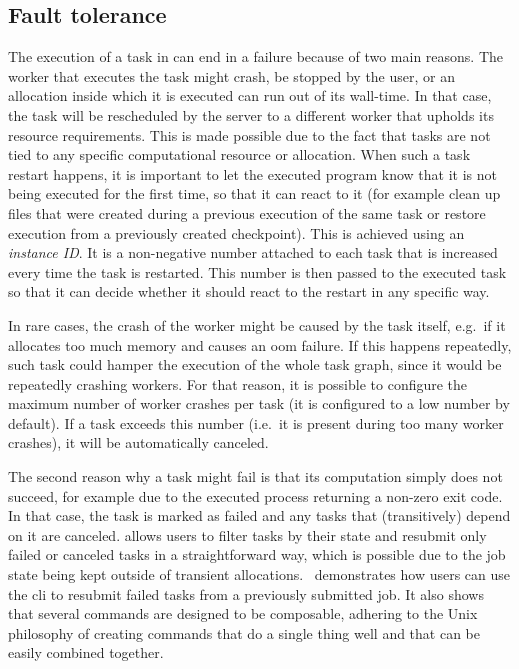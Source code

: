 \subsection{Fault tolerance}
The execution of a task in \hyperqueue{} can end in a failure because of two main
reasons. The worker that executes the task might crash, be stopped by the user, or an allocation
inside which it is executed can run out of its wall-time. In that case, the task will be
rescheduled by the server to a different worker that upholds its resource requirements. This is
made possible due to the fact that tasks are not tied to any specific computational resource or
allocation. When such a task restart happens, it is important to let the executed program know that
it is not being executed for the first time, so that it can react to it (for example clean up files
that were created during a previous execution of the same task or restore execution from a
previously created checkpoint). This is achieved using an \emph{instance ID}. It is a
non-negative number attached to each task that is increased every time the task is restarted. This
number is then passed to the executed task so that it can decide whether it should react to the
restart in any specific way.

In rare cases, the crash of the worker might be caused by the task itself, e.g.\ if it allocates
too much memory and causes an \gls{oom} failure. If this happens repeatedly, such
task could hamper the execution of the whole task graph, since it would be repeatedly crashing
workers. For that reason, it is possible to configure the maximum number of worker crashes per task
(it is configured to a low number by default). If a task exceeds this number (i.e.\ it is present
during too many worker crashes), it will be automatically canceled.

The second reason why a task might fail is that its computation simply does not succeed, for
example due to the executed process returning a non-zero exit code. In that case, the task is
marked as failed and any tasks that (transitively) depend on it are canceled.
\hyperqueue{} allows users to filter tasks by their state and resubmit only failed or
canceled tasks in a straightforward way, which is possible due to the job state being kept outside
of transient allocations.~ demonstrates how users can use the
\hq{} \gls{cli} to resubmit failed tasks from a previously
submitted job. It also shows that several \hq{} commands are designed to be
composable, adhering to the Unix philosophy of creating commands that do a single thing well and
that can be easily combined together.

